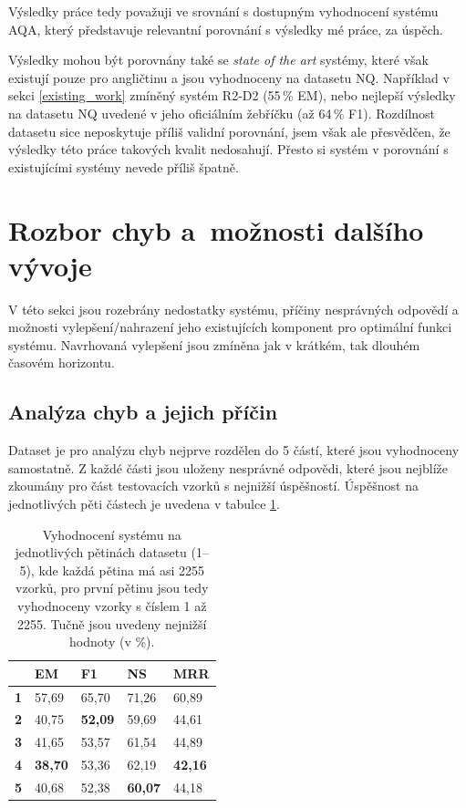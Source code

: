 Výsledky práce tedy považuji ve srovnání s dostupným vyhodnocení systému AQA, který představuje relevantní porovnání s výsledky mé práce, za úspěch.\par
Výsledky mohou být porovnány také se \textit{state of the art} systémy, které však existují pouze pro angličtinu a jsou vyhodnoceny na datasetu NQ. Například v sekci \ref{existing_work} zmíněný systém R2-D2 (55\,\% EM), nebo nejlepší výsledky na datasetu NQ uvedené v jeho oficiálním žebříčku (až 64\,\% F1). Rozdílnost datasetu sice neposkytuje příliš validní porovnání, jsem však ale přesvědčen, že výsledky této práce takových kvalit nedosahují. Přesto si systém v porovnání s existujícími systémy nevede příliš špatně.


\section{Rozbor chyb a~možnosti dalšího vývoje}
V této sekci jsou rozebrány nedostatky systému, příčiny nesprávných odpovědí a možnosti vylepšení/nahrazení jeho existujících komponent pro optimální funkci systému. Navrhovaná vylepšení jsou zmíněna jak v krátkém, tak dlouhém časovém horizontu.\par
\subsection{Analýza chyb a jejich příčin}
Dataset je pro analýzu chyb nejprve rozdělen do 5 částí, které jsou vyhodnoceny samostatně. Z každé části jsou uloženy nesprávné odpovědi, které jsou nejblíže zkoumány pro část testovacích vzorků s nejnižší úspěšností. Úspěšnost na jednotlivých pěti částech je uvedena v tabulce \ref{tab:partial_eval}.

\begin{table}[H]
\centering
\begin{tabular}{|l|l|l|l|l|}
\hline
           & \textbf{EM} & \textbf{F1} & \textbf{NS} & \textbf{MRR} \\ \hline
\textbf{1} & 57,69       & 65,70       & 71,26       & 60,89        \\ \hline
\textbf{2} & 40,75       & \textbf{52,09}       & 59,69       & 44,61        \\ \hline
\textbf{3} & 41,65       & 53,57       & 61,54       & 44,89        \\ \hline
\textbf{4} & \textbf{38,70}       & 53,36       & 62,19       & \textbf{42,16}        \\ \hline
\textbf{5} & 40,68       & 52,38       & \textbf{60,07}       & 44,18        \\ \hline
\end{tabular}
\caption{Vyhodnocení systému na jednotlivých pětinách datasetu (1--5), kde každá pětina má asi 2255 vzorků, pro první pětinu jsou tedy vyhodnoceny vzorky s číslem 1 až 2255. Tučně jsou uvedeny nejnižší hodnoty (v \%).}
\label{tab:partial_eval}
\end{table}

